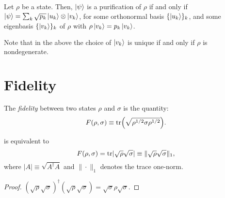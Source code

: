 \documentclass[a4paper]{report}
\begin{document}
\begin{prop}
	Let $\rho$ be a state. Then, $\ket\psi$ is a purification of $\rho$ if and only if
	$\ket\psi=\sum_k\sqrt{p_k}\ket{u_k}\otimes\ket{v_k}$,
	for some orthonormal basis $\{\ket{u_k}\}_k$, and some eigenbasis $\{\ket{v_k}\}_k$ of $\rho$ with $\rho\ket{v_k}=p_k\ket{v_k}$.
\end{prop}
Note that in the above the choice of $\ket{v_k}$ is unique if and only if $\rho$ is nondegenerate.

\section{Fidelity}

\begin{defn}\label{def:fidelity}
	The \emph{fidelity} between two states $\rho$ and $\sigma$ is the quantity:
	\begin{equation}
		F(\rho,\sigma) \equiv \tr(\sqrt{\rho^{1/2}\sigma\rho^{1/2}}).
	\end{equation}
\end{defn}

\begin{prop}\label{def:fidelity_with_abs}
	 is equivalent to
	\begin{equation}
	F(\rho,\sigma)=\tr\lvert\sqrt\rho\sqrt\sigma\rvert
	\equiv \|\sqrt\rho\sqrt\sigma\|_1,	
	\end{equation}
	where $|A|\equiv\sqrt{A^\dagger A}$ and $\|\cdot\|_1$ denotes the trace one-norm.
\end{prop}
\begin{proof}
	$(\sqrt\rho\sqrt\sigma)^\dagger (\sqrt\rho\sqrt\sigma) = \sqrt\sigma\rho\sqrt\sigma$.
\end{proof}
\end{document}
